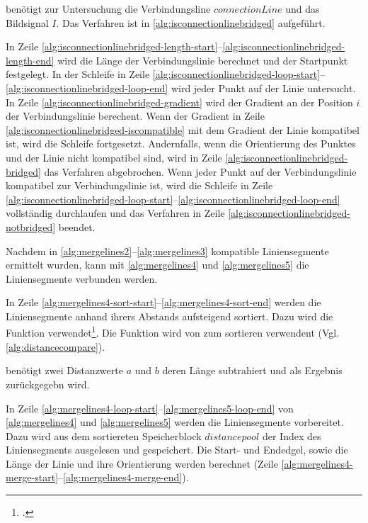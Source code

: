 

 benötigt zur Untersuchung die Verbindungsline $\mathit{connectionLine}$ und das
 Bildsignal $I$. Das Verfahren ist in \autoref{alg:isconnectionlinebridged} aufgeführt.



In Zeile \ref{alg:isconnectionlinebridged-length-start}--\ref{alg:isconnectionlinebridged-length-end} wird die Länge
 der Verbindungslinie berechnet und der Startpunkt festgelegt. In der Schleife in Zeile
 \ref{alg:isconnectionlinebridged-loop-start}--\ref{alg:isconnectionlinebridged-loop-end} wird jeder Punkt auf der
 Linie untersucht. In Zeile \ref{alg:isconnectionlinebridged-gradient} wird der Gradient an der Position $i$  der
 Verbindungslinie berechent. Wenn der Gradient in Zeile \ref{alg:isconnectionlinebridged-iscompatible} mit dem Gradient
 der Linie kompatibel ist, wird die Schleife fortgesetzt. Andernfalls, wenn die Orientierung des Punktes und der Linie
 nicht kompatibel sind, wird in Zeile \ref{alg:isconnectionlinebridged-bridged} das Verfahren abgebrochen. Wenn jeder
 Punkt auf der Verbindungslinie kompatibel zur Verbindungslinie ist, wird die Schleife in Zeile
 \ref{alg:isconnectionlinebridged-loop-start}--\ref{alg:isconnectionlinebridged-loop-end} vollständig durchlaufen und
 das Verfahren in Zeile \ref{alg:isconnectionlinebridged-notbridged} beendet.

Nachdem in \autoref{alg:mergelines2}--\autoref{alg:mergelines3} kompatible Liniensegmente ermittelt wurden, kann mit
 \autoref{alg:mergelines4} und \autoref{alg:mergelines5} die Liniensegmente verbunden werden.



In Zeile \ref{alg:mergelines4-sort-start}--\ref{alg:mergelines4-sort-end} werden die Liniensegmente anhand ihrers
 Abstands aufsteigend sortiert. Dazu wird die Funktion  verwendet\footcite{qsort}. Die Funktion
  wird von  zum sortieren verwendent (Vgl. \autoref{alg:distancecompare}).



 benötigt zwei Distanzwerte $a$ und $b$ deren Länge subtrahiert und als Ergebnis zurückgegebn wird.

In Zeile \ref{alg:mergelines4-loop-start}--\ref{alg:mergelines5-loop-end} von \autoref{alg:mergelines4} und
 \autoref{alg:mergelines5} werden die Liniensegmente vorbereitet. Dazu wird aus dem sortiereten Speicherblock
 $\mathit{distancepool}$ der Index des Liniensegments ausgelesen und gespeichert. Die Start- und Endedgel, sowie die
 Länge der Linie und ihre Orientierung werden berechnet
 (Zeile \ref{alg:mergelines4-merge-start}--\ref{alg:mergelines4-merge-end}).

